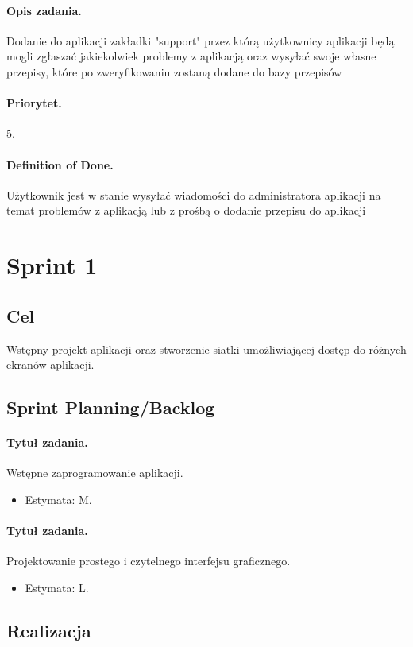 \documentclass[a4paper]{article}
\begin{document}
	\paragraph{Opis zadania.} Dodanie do aplikacji zakładki "support" przez którą użytkownicy aplikacji będą mogli zgłaszać jakiekolwiek problemy z aplikacją oraz wysyłać swoje własne przepisy, które po zweryfikowaniu zostaną dodane do bazy przepisów
	\paragraph{Priorytet.} 5.
	\paragraph{Definition of Done.} Użytkownik jest w stanie wysyłać wiadomości do administratora aplikacji na temat problemów z aplikacją lub z prośbą o dodanie przepisu do aplikacji
	
	
	\section{Sprint 1}
	\subsection{Cel} Wstępny projekt aplikacji oraz stworzenie siatki umożliwiającej dostęp do różnych ekranów aplikacji.
	\subsection{Sprint Planning/Backlog}
	
	\paragraph{Tytuł zadania.} Wstępne zaprogramowanie aplikacji.
	\begin{itemize}
		\item Estymata: M.
	\end{itemize}
	
	\paragraph{Tytuł zadania.} Projektowanie prostego i czytelnego interfejsu graficznego.
	\begin{itemize}
		\item Estymata: L.
	\end{itemize}
	
	\subsection{Realizacja}
	
\end{document}
